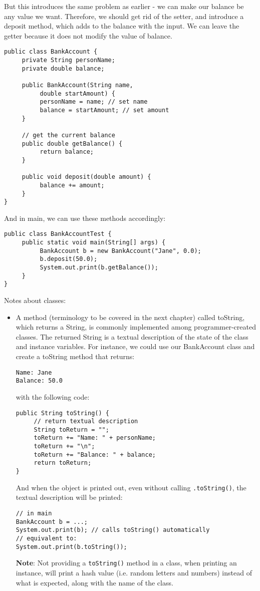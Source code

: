 But this introduces the same problem as earlier - we can make our balance be any value we want. Therefore, we should get rid of the setter, and introduce a deposit method, which adds to the balance with the input. We can leave the getter because it does not modify the value of balance.
\begin{lstlisting}
public class BankAccount {
     private String personName;
     private double balance;
     
     public BankAccount(String name, 
          double startAmount) {
          personName = name; // set name
          balance = startAmount; // set amount
     }
     
     // get the current balance
     public double getBalance() {
          return balance;
     }
     
     public void deposit(double amount) {
          balance += amount;
     }
}
\end{lstlisting}
And in main, we can use these methods accordingly:
\begin{lstlisting}
public class BankAccountTest {
     public static void main(String[] args) {
          BankAccount b = new BankAccount("Jane", 0.0);
          b.deposit(50.0);
          System.out.print(b.getBalance());
     }
}
\end{lstlisting}

Notes about classes:
\begin{itemize}
\item A method (terminology to be covered in the next chapter) called toString, which returns a String, is commonly implemented among programmer-created classes. The returned String is a textual description of the state of the class and instance variables. For instance, we could use our BankAccount class and create a toString method that returns:
\begin{verbatim}
Name: Jane
Balance: 50.0
\end{verbatim}
with the following code:
\begin{lstlisting}
public String toString() {
     // return textual description
     String toReturn = "";
     toReturn += "Name: " + personName;
     toReturn += "\n";
     toReturn += "Balance: " + balance;
     return toReturn;
}
\end{lstlisting}
And when the object is printed out, even without calling \verb|.toString()|, the textual description will be printed:
\begin{lstlisting}
// in main
BankAccount b = ...;
System.out.print(b); // calls toString() automatically
// equivalent to:
System.out.print(b.toString());
\end{lstlisting}
\textbf{Note}: Not providing a \verb|toString()| method in a class, when printing an instance, will print a hash value (i.e. random letters and numbers) instead of what is expected, along with the name of the class.
\end{itemize}

